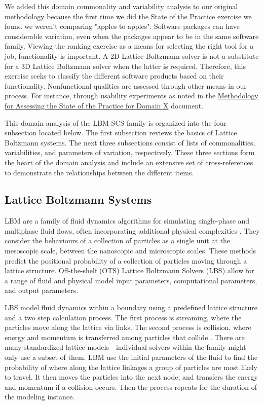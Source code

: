 \documentclass[12pt, notitlepage]{article}
\begin{document}
We added this domain commonality and variability analysis to our original methodology because the first time we did the State of the Practice exercise we found we weren't comparing "apples to apples". Software packages can have considerable variation, even when the packages appear to be in the same software family. Viewing the ranking exercise as a means for selecting the right tool for a job, functionality is important. A 2D Lattice Boltzmann solver is not a substitute for a 3D Lattice Boltzmann solver when the latter is required. Therefore, this exercise seeks to classify the different software products based on their functionality. Nonfunctional qualities are assessed through other means in our process. For instance, through usability experiments as noted in the \href{https://github.com/smiths/AIMSS/blob/master/StateOfPractice/Methodology/Methodology.pdf}{Methodology for Assessing the State of the Practice for Domain X} document. 

This domain analysis of the LBM SCS family is organized into the four subsection located below. The first subsection reviews the basics of Lattice Boltzmann systems. The next three subsections consist of lists of commonalities, variabilities, and parameters of variation, respectively. These three sections form the heart of the domain analysis and include an extensive set of cross-references to demonstrate the relationships between the different items.

\subsection{Lattice Boltzmann Systems}

LBM are a family of fluid dynamics algorithms for simulating single-phase and multiphase fluid flows, often incorporating additional physical complexities \citep{chen1998lattice}. They consider the behaviours of a collection of particles as a single unit at the mesoscopic scale, between the nanoscopic and microscopic scales. These methods predict the positional probability of a collection of particles moving through a lattice structure. Off-the-shelf (OTS) Lattice Boltzmann Solvers (LBS) allow for a range of fluid and physical model input parameters, computational parameters, and output parameters.

LBS model fluid dynamics within a boundary using a predefined lattice structure and a two step calculation process. The first process is streaming, where the particles move along the lattice via links. The second process is collision, where energy and momentum is transferred among particles that collide \citep{bao2011lattice}.
There are many standardized lattice models - individual solvers within the family might only use a subset of them.
LBM use the initial parameters of the fluid to find the probability of where along the lattice linkages a group of particles are most likely to travel. It then moves the particles into the next node, and transfers the energy and momentum if a collision occurs. Then the process repeats for the duration of the modeling instance.
\end{document}
